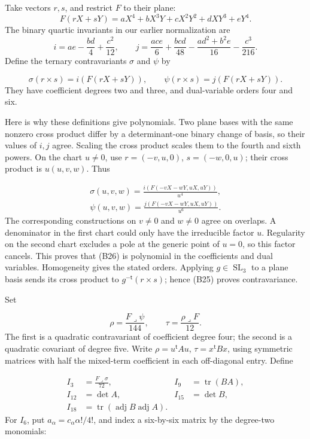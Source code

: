 \documentclass[
]{article}
\begin{document}
Take vectors \(r,s\), and restrict \(F\) to their plane: \[
F(rX+sY)=aX^4+bX^3Y+cX^2Y^2+dXY^3+eY^4.
\] The binary quartic invariants in our earlier normalization are \[
i=ae-\frac{bd}{4}+\frac{c^2}{12},\qquad
j=\frac{ace}{6}+\frac{bcd}{48}-\frac{ad^2+b^2e}{16}-\frac{c^3}{216}.
\] Define the ternary contravariants \(\sigma\) and \(\psi\) by
\protect{}\label{equation-B25}{}

\[
\sigma(r\times s)=i(F(rX+sY)),\qquad
\psi(r\times s)=j(F(rX+sY)).
\tag{B25}
\] They have coefficient degrees two and three, and dual-variable orders
four and six.

Here is why these definitions give polynomials. Two plane bases with the
same nonzero cross product differ by a determinant-one binary change of
basis, so their values of \(i,j\) agree. Scaling the cross product
scales them to the fourth and sixth powers. On the chart \(u\ne0\), use
\(r=(-v,u,0)\), \(s=(-w,0,u)\); their cross product is \(u(u,v,w)\).
Thus \protect{}\label{equation-B26}{}

\[
\begin{gathered}
\sigma(u,v,w)=\frac{i(F(-vX-wY,uX,uY))}{u^4},\\
\psi(u,v,w)=\frac{j(F(-vX-wY,uX,uY))}{u^6}.
\end{gathered}
\tag{B26}
\] The corresponding constructions on \(v\ne0\) and \(w\ne0\) agree on
overlaps. A denominator in the first chart could only have the
irreducible factor \(u\). Regularity on the second chart excludes a pole
at the generic point of \(u=0\), so this factor cancels. This proves
that (B26) is polynomial in the coefficients and dual variables.
Homogeneity gives the stated orders. Applying
\(g\in\operatorname{SL}_3\) to a plane basis sends its cross product to
\(g^{-\mathsf t}(r\times s)\); hence (B25) proves contravariance.

Set \protect{}\label{equation-B27}{}

\[
\rho=\frac{F\mathbin{\lrcorner}\psi}{144},\qquad
\tau=\frac{\rho\mathbin{\lrcorner}F}{12}.
\tag{B27}
\] The first is a quadratic contravariant of coefficient degree four;
the second is a quadratic covariant of degree five. Write
\(\rho=u^{\mathsf t}Au\), \(\tau=x^{\mathsf t}Bx\), using symmetric
matrices with half the mixed-term coefficient in each off-diagonal
entry. Define \protect{}\label{equation-B28}{}

\[
\begin{aligned}
I_3&=\frac{F\mathbin{\lrcorner}\sigma}{72},&
I_9&=\operatorname{tr}(BA),\\
I_{12}&=\det A,& I_{15}&=\det B,\\
I_{18}&=\operatorname{tr}(\operatorname{adj}B\operatorname{adj}A).
\end{aligned}
\tag{B28}
\] For \(I_6\), put \(a_\alpha=c_\alpha\alpha!/4!\), and index a
six-by-six matrix by the degree-two monomials:
\protect{}\label{equation-B29}{}
\end{document}
